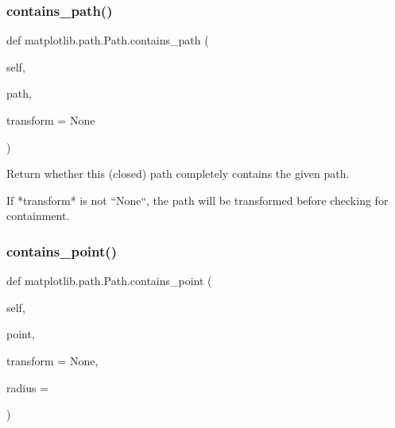 \mbox{\label{classmatplotlib_1_1path_1_1Path_aff9468aab8094f1dff2fa551c60297a5}} 
\subsubsection{\texorpdfstring{contains\+\_\+path()}{contains\_path()}}
{\footnotesize\ttfamily def matplotlib.\+path.\+Path.\+contains\+\_\+path (\begin{DoxyParamCaption}\item[{}]{self,  }\item[{}]{path,  }\item[{}]{transform = {\ttfamily None} }\end{DoxyParamCaption})}

\begin{DoxyVerb}Return whether this (closed) path completely contains the given path.

If *transform* is not ``None``, the path will be transformed before
checking for containment.
\end{DoxyVerb}
 \mbox{\label{classmatplotlib_1_1path_1_1Path_a4e421167fb76e408649b79f4ba4f11f5}} 
\subsubsection{\texorpdfstring{contains\+\_\+point()}{contains\_point()}}
{\footnotesize\ttfamily def matplotlib.\+path.\+Path.\+contains\+\_\+point (\begin{DoxyParamCaption}\item[{}]{self,  }\item[{}]{point,  }\item[{}]{transform = {\ttfamily None},  }\item[{}]{radius = {} }\end{DoxyParamCaption})}

